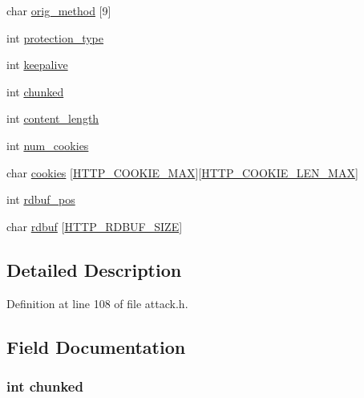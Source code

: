 \begin{DoxyCompactItemize}
char \hyperlink{structattack__http__state_a398e2066f28cd1b1cb239a08538f47bf}{orig\+\_\+method} \mbox{[}9\mbox{]}
\item 
int \hyperlink{structattack__http__state_a0065f11b6f92dfe81a17ad6d00c38e56}{protection\+\_\+type}
\item 
int \hyperlink{structattack__http__state_ae314c4b48027be9feab52906b6313b73}{keepalive}
\item 
int \hyperlink{structattack__http__state_a9fc0096dd38d9cc699740cf0adb6e6f4}{chunked}
\item 
int \hyperlink{structattack__http__state_a675a47f46ecd9d8ec01c738e04c28cbe}{content\+\_\+length}
\item 
int \hyperlink{structattack__http__state_ab111b3821877d2ab73beb1361177bf39}{num\+\_\+cookies}
\item 
char \hyperlink{structattack__http__state_a5748f13b817aec88794a184c67b44863}{cookies} \mbox{[}\hyperlink{attack_8h_a7afb6e2da31b70aad81a3a8c4cce03ac}{H\+T\+T\+P\+\_\+\+C\+O\+O\+K\+I\+E\+\_\+\+M\+AX}\mbox{]}\mbox{[}\hyperlink{attack_8h_a843d2259e52b51843a2abe0bfb764dc4}{H\+T\+T\+P\+\_\+\+C\+O\+O\+K\+I\+E\+\_\+\+L\+E\+N\+\_\+\+M\+AX}\mbox{]}
\item 
int \hyperlink{structattack__http__state_abd4c86054fbe97fb3b12d233da01798d}{rdbuf\+\_\+pos}
\item 
char \hyperlink{structattack__http__state_af25afdcfe34a5d58999517c10dd10b08}{rdbuf} \mbox{[}\hyperlink{attack_8h_ac6eda2a3273daf4a93162bb51f969093}{H\+T\+T\+P\+\_\+\+R\+D\+B\+U\+F\+\_\+\+S\+I\+ZE}\mbox{]}
\end{DoxyCompactItemize}


\subsection{Detailed Description}


Definition at line 108 of file attack.\+h.



\subsection{Field Documentation}
\subsubsection[{\texorpdfstring{chunked}{chunked}}]{\setlength{\rightskip}{0pt plus 5cm}int chunked}\hypertarget{structattack__http__state_a9fc0096dd38d9cc699740cf0adb6e6f4}{}\label{structattack__http__state_a9fc0096dd38d9cc699740cf0adb6e6f4}



